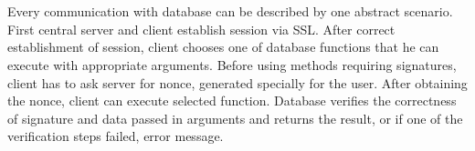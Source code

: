 \chapter{}

Every communication with database can be described by one abstract scenario.
First central server and client establish session via SSL. After correct establishment of session, client chooses one of database functions that he can execute with appropriate arguments. Before using methods requiring signatures, client has to ask server for nonce, generated specially for the user. After obtaining the nonce, client can execute selected function.
Database verifies the correctness of signature and data passed in arguments and returns the result, or if one of the verification steps failed, error message.


